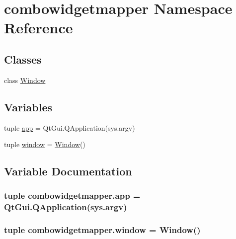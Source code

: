 \hypertarget{namespacecombowidgetmapper}{}\section{combowidgetmapper Namespace Reference}
\label{namespacecombowidgetmapper}
\subsection*{Classes}
\begin{DoxyCompactItemize}
\item 
class \hyperlink{classcombowidgetmapper_1_1Window}{Window}
\end{DoxyCompactItemize}
\subsection*{Variables}
\begin{DoxyCompactItemize}
\item 
tuple \hyperlink{namespacecombowidgetmapper_ade19d8f6a0e6963544d0d6d7b9726779}{app} = Qt\+Gui.\+Q\+Application(sys.\+argv)
\item 
tuple \hyperlink{namespacecombowidgetmapper_a51dd49cb4e279db7b07e0a563d41eb57}{window} = \hyperlink{classcombowidgetmapper_1_1Window}{Window}()
\end{DoxyCompactItemize}


\subsection{Variable Documentation}
\hypertarget{namespacecombowidgetmapper_ade19d8f6a0e6963544d0d6d7b9726779}{}
\subsubsection[{app}]{\setlength{\rightskip}{0pt plus 5cm}tuple combowidgetmapper.\+app = Qt\+Gui.\+Q\+Application(sys.\+argv)}\label{namespacecombowidgetmapper_ade19d8f6a0e6963544d0d6d7b9726779}
\hypertarget{namespacecombowidgetmapper_a51dd49cb4e279db7b07e0a563d41eb57}{}
\subsubsection[{window}]{\setlength{\rightskip}{0pt plus 5cm}tuple combowidgetmapper.\+window = {\bf Window}()}\label{namespacecombowidgetmapper_a51dd49cb4e279db7b07e0a563d41eb57}

